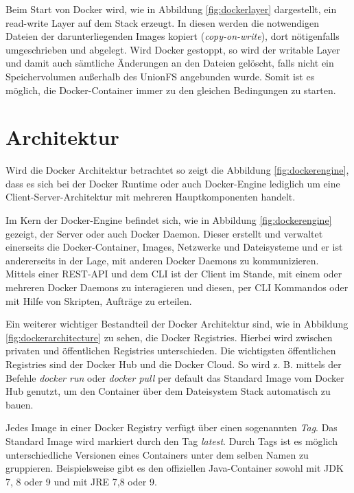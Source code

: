 Beim Start von Docker wird, wie in Abbildung \ref{fig:dockerlayer} dargestellt, ein read-write Layer auf dem Stack erzeugt.
In diesen werden die notwendigen Dateien der darunterliegenden Images kopiert (\textit{copy-on-write}), dort nötigenfalls umgeschrieben und abgelegt.
Wird Docker gestoppt, so wird der writable Layer und damit auch sämtliche Änderungen an den Dateien gelöscht, falls nicht ein Speichervolumen außerhalb des \ac{UnionFS} angebunden wurde.
Somit ist es möglich, die Docker-Container immer zu den gleichen Bedingungen zu starten.

\section{Architektur}
\label{c:architektur}

Wird die Docker Architektur betrachtet so zeigt die Abbildung \ref{fig:dockerengine}, dass es sich bei der Docker Runtime oder auch Docker-Engine lediglich um eine Client-Server-Architektur mit mehreren Hauptkomponenten handelt.

Im Kern der Docker-Engine befindet sich, wie in Abbildung \ref{fig:dockerengine} gezeigt, der Server oder auch Docker Daemon.
Dieser erstellt und verwaltet einerseits die Docker-Container, Images, Netzwerke und Dateisysteme und er ist andererseits in der Lage, mit anderen Docker Daemons zu kommunizieren.
Mittels einer REST-API und dem \ac{CLI} ist der Client im Stande, mit einem oder mehreren Docker Daemons zu interagieren und diesen, per \ac{CLI} Kommandos oder mit Hilfe von Skripten, Aufträge zu erteilen.

Ein weiterer wichtiger Bestandteil der Docker Architektur sind, wie in Abbildung \ref{fig:dockerarchitecture} zu sehen, die Docker Registries.
Hierbei wird zwischen privaten und öffentlichen Registries unterschieden.
Die wichtigsten öffentlichen Registries sind der Docker Hub und die Docker Cloud.
So wird z. B. mittels der Befehle \textit{docker run} oder \textit{docker pull} per default das Standard Image vom Docker Hub genutzt, um den Container über dem Dateisystem Stack automatisch zu bauen.

Jedes Image in einer Docker Registry verfügt über einen sogenannten \textit{Tag}.
Das Standard Image wird markiert durch den Tag \textit{latest}.
Durch Tags ist es möglich unterschiedliche Versionen eines Containers unter dem selben Namen zu gruppieren.
Beispielsweise gibt es den offiziellen Java-Container sowohl mit JDK 7, 8 oder 9 und mit JRE 7,8 oder 9.

